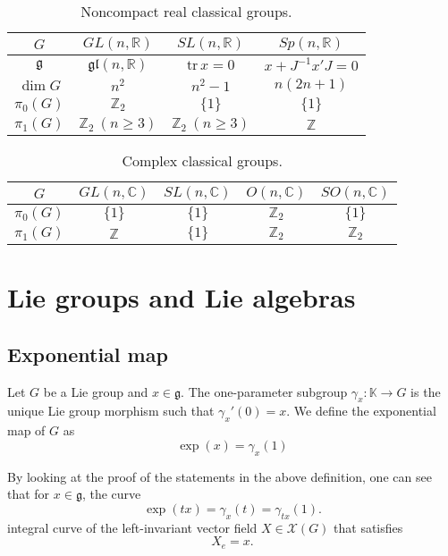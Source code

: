 \documentclass{report}
\begin{document}
\begin{table}[h!]
    \centering
    \begin{tabular}{c c c c}
        $G$ & $GL(n, \mathbb{R})$ & $SL(n, \mathbb{R})$ & $Sp(n, \mathbb{R})$ \\
        \hline \hline
        $\mathfrak{g}$ & $\mathfrak{gl}(n, \mathbb{R})$ & $\text{tr} \, x = 0$ & $x + J^{-1}x'J = 0$ \\
        $\dim G$ & $n^2$ & $n^2 - 1$ & $n(2n + 1)$ \\
        $\pi_0(G)$ & $\mathbb{Z}_2$ & $\{1\}$ & $\{1\}$ \\
        $\pi_1(G)$ & $\mathbb{Z}_2 \ (n \ge 3)$ & $\mathbb{Z}_2 \ (n \ge 3)$ & $\mathbb{Z}$ \\
    \end{tabular}
    \caption{Noncompact real classical groups.}
    \label{table:noncompact_real_classical_groups}
\end{table}

\begin{table}[h!]
    \centering
    \begin{tabular}{c c c c c}
        $G$ & $GL(n, \mathbb{C})$ & $SL(n, \mathbb{C})$ & $O(n, \mathbb{C})$ & $SO(n, \mathbb{C})$ \\
        \hline \hline
        $\pi_0(G)$ & $\{1\}$ & $\{1\}$ & $\mathbb{Z}_2$ & $\{1\}$ \\
        $\pi_1(G)$ & $\mathbb{Z}$ & $\{1\}$ & $\mathbb{Z}_2$ & $\mathbb{Z}_2$ \\
    \end{tabular}
    \caption{Complex classical groups.}
    \label{table:complex_classical_groups}
\end{table}

\chapter{Lie groups and Lie algebras}
\section{Exponential map}
\begin{definition}
    Let $G$ be a Lie group and $x \in \mathfrak g$.
    The one-parameter subgroup $\gamma_x: \mathbb K \to G$ is the unique Lie group morphism such that $\gamma_x'(0) = x$.
    We define the exponential map of $G$ as
    \[
    \exp(x) = \gamma_x(1)
    \]
\end{definition}
\begin{remark}
    By looking at the proof of the statements in the above definition, one can see that for $x\in \mathfrak g$, the curve
    \[
    \exp(tx) = \gamma_x(t) = \gamma_{tx}(1).
    \]
    integral curve of the left-invariant vector field $X \in \mathcal X(G)$ that satisfies
    \[
    X_e = x.
    \]
\end{remark}
\end{document}
